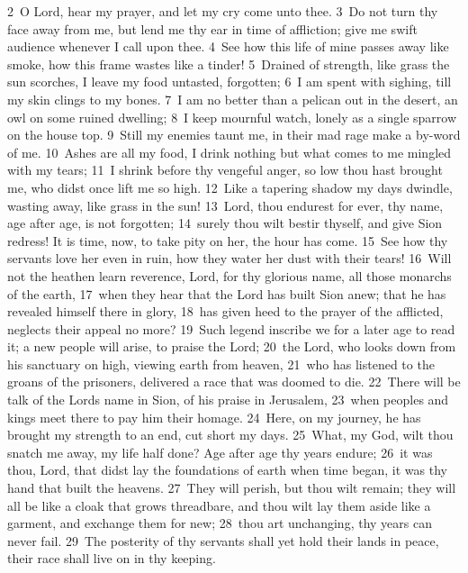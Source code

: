 \documentclass[10pt]{book} %
\begin{document}
\textcolor{benred8}{2}~O Lord, hear my prayer, and let my cry come unto thee. \textcolor{benred8}{3}~Do not turn thy face away from me, but lend me thy ear in time of affliction; give me swift audience whenever I call upon thee. \textcolor{benred8}{4}~See how this life of mine passes away like smoke, how this frame wastes like a tinder! \textcolor{benred8}{5}~Drained of strength, like grass the sun scorches, I leave my food untasted, forgotten; \textcolor{benred8}{6}~I am spent with sighing, till my skin clings to my bones. \textcolor{benred8}{7}~I am no better than a pelican out in the desert, an owl on some ruined dwelling; \textcolor{benred8}{8}~I keep mournful watch, lonely as a single sparrow on the house top. \textcolor{benred8}{9}~Still my enemies taunt me, in their mad rage make a by-word of me. \textcolor{benred8}{10}~Ashes are all my food, I drink nothing but what comes to me mingled with my tears; \textcolor{benred8}{11}~I shrink before thy vengeful anger, so low thou hast brought me, who didst once lift me so high. \textcolor{benred8}{12}~Like a tapering shadow my days dwindle, wasting away, like grass in the sun!
\textcolor{benred8}{13}~Lord, thou endurest for ever, thy name, age after age, is not forgotten; \textcolor{benred8}{14}~surely thou wilt bestir thyself, and give Sion redress! It is time, now, to take pity on her, the hour has come. \textcolor{benred8}{15}~See how thy servants love her even in ruin, how they water her dust with their tears! \textcolor{benred8}{16}~Will not the heathen learn reverence, Lord, for thy glorious name, all those monarchs of the earth, \textcolor{benred8}{17}~when they hear that the Lord has built Sion anew; that he has revealed himself there in glory, \textcolor{benred8}{18}~has given heed to the prayer of the afflicted, neglects their appeal no more? \textcolor{benred8}{19}~Such legend inscribe we for a later age to read it; a new people will arise, to praise the Lord; \textcolor{benred8}{20}~the Lord, who looks down from his sanctuary on high, viewing earth from heaven, \textcolor{benred8}{21}~who has listened to the groans of the prisoners, delivered a race that was doomed to die. \textcolor{benred8}{22}~There will be talk of the Lord\textquotesingle s name in Sion, of his praise in Jerusalem, \textcolor{benred8}{23}~when peoples and kings meet there to pay him their homage.
\textcolor{benred8}{24}~Here, on my journey, he has brought my strength to an end, cut short my days. \textcolor{benred8}{25}~What, my God, wilt thou snatch me away, my life half done? Age after age thy years endure; \textcolor{benred8}{26}~it was thou, Lord, that didst lay the foundations of earth when time began, it was thy hand that built the heavens. \textcolor{benred8}{27}~They will perish, but thou wilt remain; they will all be like a cloak that grows threadbare, and thou wilt lay them aside like a garment, and exchange them for new; \textcolor{benred8}{28}~thou art unchanging, thy years can never fail. \textcolor{benred8}{29}~The posterity of thy servants shall yet hold their lands in peace, their race shall live on in thy keeping.
\end{document}
